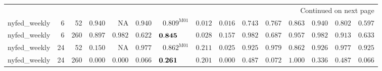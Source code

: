 \documentclass[10pt,a4paper]{article}
\begin{document}
\begin{longtable}{@{}lrrrrrrrrrrrrrr@{}}
\midrule\multicolumn{15}{r}{Continued on next page}\\\endfoot
\bottomrule\endlastfoot
nyfed\_weekly & 6 & 52 & $\mathbf{0.940}$ & \textsc{NA} & $\mathbf{0.940}$ & $\mathbf{0.809}^{\mathrm{M01}}$ & $0.012$ & $0.016$ & $\mathbf{0.743}$ & $\mathbf{0.767}$ & $\mathbf{0.863}$ & $\mathbf{0.940}$ & $\mathbf{0.802}$ & $\mathbf{0.597}$ \\
nyfed\_weekly & 6 & 260 & $\mathbf{0.897}$ & $\mathbf{0.982}$ & $\mathbf{0.622}$ & $\mathbf{0.845}\hphantom{^{\mathrm{M00}}}$ & $0.028$ & $\mathbf{0.157}$ & $\mathbf{0.982}$ & $\mathbf{0.687}$ & $\mathbf{0.957}$ & $\mathbf{0.982}$ & $\mathbf{0.913}$ & $\mathbf{0.633}$ \\
nyfed\_weekly & 24 & 52 & $\mathbf{0.150}$ & \textsc{NA} & $\mathbf{0.977}$ & $\mathbf{0.862}^{\mathrm{M01}}$ & $\mathbf{0.211}$ & $0.025$ & $\mathbf{0.925}$ & $\mathbf{0.979}$ & $\mathbf{0.862}$ & $\mathbf{0.926}$ & $\mathbf{0.977}$ & $\mathbf{0.925}$ \\
nyfed\_weekly & 24 & 260 & $0.000$ & $0.000$ & $0.066$ & $\mathbf{0.261}\hphantom{^{\mathrm{M00}}}$ & $\mathbf{0.201}$ & $0.000$ & $\mathbf{0.487}$ & $0.072$ & $\mathbf{1.000}$ & $\mathbf{0.336}$ & $\mathbf{0.487}$ & $0.066$ \\
\end{longtable}
\end{document}
